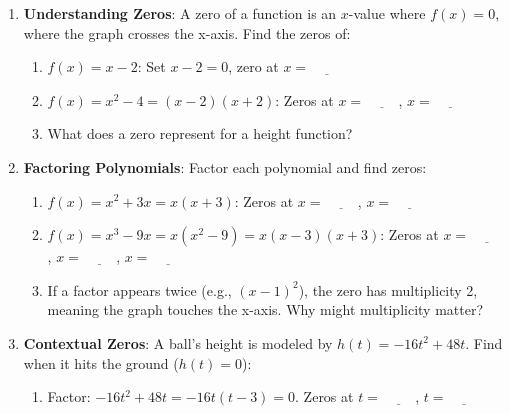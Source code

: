 \documentclass[12pt]{article}
\begin{document}
\begin{enumerate}[label=5.\arabic*]
    \item \textbf{Understanding Zeros}: A zero of a function is an \( x \)-value where \( f(x) = 0 \), where the graph crosses the x-axis. Find the zeros of:
    \begin{enumerate}[label=\alph*)]
        \item \( f(x) = x - 2 \): Set \( x - 2 = 0 \), zero at \( x = \underline{\hspace{1cm}} \)
        \item \( f(x) = x^2 - 4 = (x - 2)(x + 2) \): Zeros at \( x = \underline{\hspace{1cm}} \), \( x = \underline{\hspace{1cm}} \)
        \item What does a zero represent for a height function? \underline{\hspace{6cm}}
    \end{enumerate}
    \item \textbf{Factoring Polynomials}: Factor each polynomial and find zeros:
    \begin{enumerate}[label=\alph*)]
        \item \( f(x) = x^2 + 3x = x(x + 3) \): Zeros at \( x = \underline{\hspace{1cm}} \), \( x = \underline{\hspace{1cm}} \)
        \item \( f(x) = x^3 - 9x = x(x^2 - 9) = x(x - 3)(x + 3) \): Zeros at \( x = \underline{\hspace{1cm}} \), \( x = \underline{\hspace{1cm}} \), \( x = \underline{\hspace{1cm}} \)
        \item If a factor appears twice (e.g., \( (x - 1)^2 \)), the zero has multiplicity 2, meaning the graph touches the x-axis. Why might multiplicity matter? \underline{\hspace{4cm}}
    \end{enumerate}
    \item \textbf{Contextual Zeros}: A ball’s height is modeled by \( h(t) = -16t^2 + 48t \). Find when it hits the ground (\( h(t) = 0 \)):
    \begin{enumerate}[label=\alph*)]
        \item Factor: \( -16t^2 + 48t = -16t(t - 3) = 0 \). Zeros at \( t = \underline{\hspace{1cm}} \), \( t = \underline{\hspace{1cm}} \)

\end{enumerate}
\end{enumerate}
\end{document}
